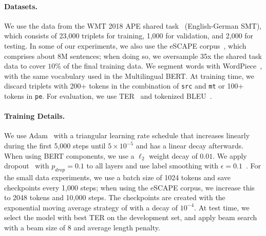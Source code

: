 \paragraph*{Datasets.}
We use the data from the WMT 2018 APE shared
task~\citep{Chatterjee2018} (English-German SMT), which consists of
23,000 triplets for training, 1,000 for validation, and 2,000 for
testing. In some of our experiments, we also use the eSCAPE
corpus~\citep{negri2018escape}, which comprises about 8M sentences;
when doing so, we oversample 35x the shared task data to cover $10\%$
of the final training data. We segment words with
WordPiece~\citep{wu2016google}, with the same vocabulary used in the
Multilingual BERT. At training time, we discard triplets with 200+
tokens in the combination of {\tt src} and {\tt mt} or 100+ tokens in
  {\tt pe}. For evaluation, we use TER~\citep{snover2006study} and
tokenized BLEU~\citep{papineni2002bleu}.

\paragraph*{Training Details.}
We use Adam~\citep{kingma2014adam} with a triangular learning rate
schedule that increases linearly during the first 5,000 steps until
$5\times 10^{-5}$ and has a linear decay afterwards. When using BERT
components, we use a $\ell_2$ weight decay of $0.01$. We apply
dropout~\citep{srivastava2014dropout} with $p_{drop}=0.1$ to all
layers and use label smoothing with
$\epsilon=0.1$~\citep{pereyra2017regularizing}. For the small data
experiments, we use a batch size of 1024 tokens and save checkpoints
every 1,000 steps; when using the eSCAPE corpus, we increase this to
2048 tokens and 10,000 steps. The checkpoints are created with the
exponential moving average strategy of \citet{junczys2018marian}
with a decay of $10^{-4}$. At test time, we select the model with
best TER on the development set, and apply beam search with a beam
size of 8 and average length penalty.

